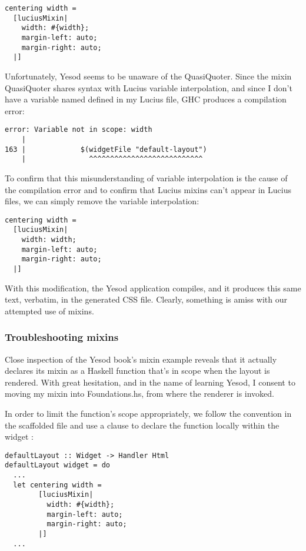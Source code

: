 \begin{Verbatim}
centering width =
  [luciusMixin|
    width: #{width};
    margin-left: auto;
    margin-right: auto;
  |]
\end{Verbatim}

Unfortunately, Yesod seems to be unaware of the QuasiQuoter. Since the mixin QuasiQuoter shares syntax with Lucius variable interpolation, and since I don't have a variable named  defined in my Lucius file, GHC produces a compilation error:

\begin{Verbatim}
error: Variable not in scope: width
    |
163 |             $(widgetFile "default-layout")
    |               ^^^^^^^^^^^^^^^^^^^^^^^^^^^

\end{Verbatim}

To confirm that this misunderstanding of variable interpolation is the cause of the compilation error and to confirm that Lucius mixins can't appear in Lucius files, we can simply remove the variable interpolation:

\begin{Verbatim}
centering width =
  [luciusMixin|
    width: width;
    margin-left: auto;
    margin-right: auto;
  |]
\end{Verbatim}

With this modification, the Yesod application compiles, and it produces this same text, verbatim, in the generated CSS file. Clearly, something is amiss with our attempted use of mixins.

\subsubsection{Troubleshooting mixins} 

Close inspection of the Yesod book's mixin example \cite{ybkShakes} reveals that it actually declares its mixin as a Haskell function that's in scope when the layout is rendered. With great hesitation, and in the name of learning Yesod, I consent to moving my mixin into Foundations.hs, from where the renderer is invoked.

In order to limit the function's scope appropriately, we follow the convention in the scaffolded file and use a  clause to declare the function locally within the  widget :

\begin{Verbatim}
defaultLayout :: Widget -> Handler Html
defaultLayout widget = do
  ...
  let centering width =
        [luciusMixin|
          width: #{width};
          margin-left: auto;
          margin-right: auto;
        |]
  ...
\end{Verbatim}

